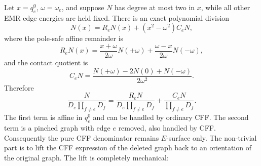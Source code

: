 \documentclass[11pt,a4paper]{report}
\begin{document}
Let \(x=q_e^0\), \(\omega=\omega_e\), and suppose \(N\) has degree at most two
in \(x\), while all other EMR edge energies are held fixed.  There is an exact
polynomial division
\begin{equation}
  N(x)=R_eN(x)+\left(x^2-\omega^2\right)C_eN,
  \label{eq:quadratic-division}
\end{equation}
where the pole-safe affine remainder is
\begin{equation}
  R_eN(x)=
  \frac{x+\omega}{2\omega}N(+\omega)
  +
  \frac{\omega-x}{2\omega}N(-\omega),
  \label{eq:quadratic-remainder}
\end{equation}
and the contact quotient is
\begin{equation}
  C_eN=
  \frac{N(+\omega)-2N(0)+N(-\omega)}{2\omega^2}.
  \label{eq:quadratic-contact}
\end{equation}
Therefore
\begin{equation}
  \frac{N}{D_e\prod_{f\ne e}D_f}
  =
  \frac{R_eN}{D_e\prod_{f\ne e}D_f}
  +
  \frac{C_eN}{\prod_{f\ne e}D_f}.
  \label{eq:quadratic-master}
\end{equation}
The first term is affine in \(q_e^0\) and can be handled by ordinary CFF.  The
second term is a pinched graph with edge \(e\) removed, also handled by CFF.
Consequently the pure CFF denominator remains \(E\)-surface only.  The
non-trivial part is to lift the CFF expression of the deleted graph back to an
orientation of the original graph.  The lift is completely mechanical:
\end{document}
